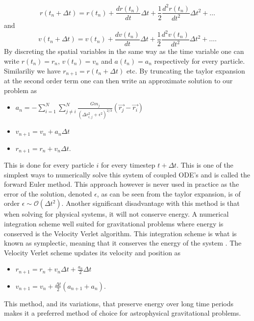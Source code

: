 \begin{equation}
    r(t_n+\Delta t) = r(t_n) + \frac{dr(t_n)}{dt}\Delta t + \frac{1}{2}\frac{d^2r(t_n)}{dt^2}\Delta t^2 +\ldots
\end{equation}
and
\begin{equation}
    v(t_n+\Delta t) = v(t_n) + \frac{dv(t_n)}{dt}\Delta t + \frac{1}{2}\frac{d^2v(t_n)}{dt^2}\Delta t^2 +\ldots.
\end{equation}
By discreting the spatial variables in the same way as the time variable one can
write $r(t_n)=r_n$, $v(t_n)=v_n$ and $a(t_n)=a_n$ respectively for every particle.
Similariliy we have $r_{n+1}=r(t_n + \Delta t)$ etc.
By truncating the taylor expansion at the second order term one can then write
an approximate solution to our problem as
\begin{center}
\begin{itemize}
    \item $a_n=-\sum_{i=1}^{N}\sum_{j\neq i}^N\frac{Gm_j}{(\Delta
    r_{i,j}^2+\epsilon^2)^{2/3}}(\vec{r_j}-\vec{r_i})$
    \item $v_{n+1} = v_n + a_n\Delta t$
    \item $r_{n+1} = r_n + v_n\Delta t.$
\end{itemize}
\end{center}
This is done for every particle $i$ for every timestep $t+\Delta t$. This is one
of the simplest ways to numerically solve this system of coupled ODE's and is called the forward
Euler method. This approach however is never used in practice as the error of
the solution, denoted $\epsilon$, as can be seen from the taylor expansion, is of order
$\epsilon\sim\mathcal{O}(\Delta t^2)$. Another significant disadvantage with this method is
that when solving for physical systems, it will not conserve energy. A numerical
integration scheme well suited for gravitational problems where energy is
conserved is the Velocity Verlet algorithm. This integration scheme is what is
known as symplectic, meaning that it conserves the energy of the system
\cite[p.~31]{holmes2007introduction}. The Velocity Verlet scheme updates its
velocity and position as
\begin{center}
    \begin{itemize}
        \item $r_{n+1} = r_n + v_n\Delta t+\frac{a_n}{2}\Delta t$
        \item $v_{n+1} = v_n + \frac{\Delta t}{2}(a_{n+1}+a_n).$
    \end{itemize}
\end{center}
This method, and its variations, that preserve energy over long time periods
makes it a preferred method of choice for astrophysical gravitational problems.
